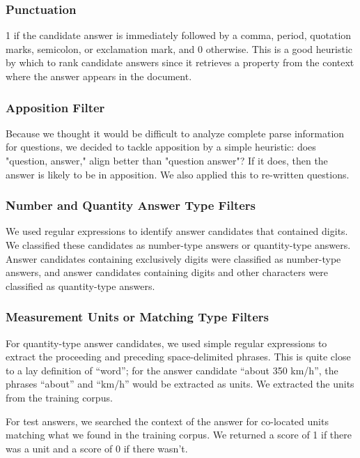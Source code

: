 \documentclass{article}
\begin{document}
\subsubsection{Punctuation}

1 if the candidate answer is immediately followed by a comma, period, quotation
marks, semicolon, or exclamation mark, and 0 otherwise. This is a good heuristic
by which to rank candidate answers since it retrieves a property from the
context where the answer appears in the document.

\subsubsection{Apposition Filter}

Because we thought it would be difficult to analyze complete parse information
for questions, we decided to tackle apposition by a simple heuristic:  does
"question, answer," align better than "question answer"?  If it does, then the
answer is likely to be in apposition.  We also applied this to re-written
questions.

\subsubsection{Number and Quantity Answer Type Filters}
We used regular expressions to identify answer candidates that contained digits.
We classified these candidates as number-type answers or quantity-type answers.
Answer candidates containing exclusively digits were classified as number-type
answers, and answer candidates containing digits and other characters were
classified as quantity-type answers.

\subsubsection{Measurement Units or Matching Type Filters}
For quantity-type answer candidates, we used simple regular expressions to
extract the proceeding and preceding space-delimited phrases. This is quite
close to a lay definition of ``word''; for the answer candidate ``about 350
km/h'', the phrases ``about'' and ``km/h'' would be extracted as units. We
extracted the units from the training corpus.

For test answers, we searched the context of the answer for co-located units
matching what we found in the training corpus. We returned a score of 1 if there
was a unit and a score of 0 if there wasn't.
\end{document}
